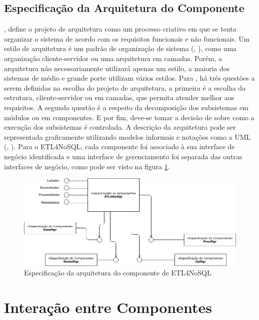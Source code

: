 \subsection{Especificação da Arquitetura do Componente}

\cite{sommerville:2013}, define o projeto de arquitetura como um processo criativo em que se tenta organizar o sistema de acordo com os requisitos funcionais e não funcionais. Um estilo de arquitetura é um padrão de organização de sistema (\cite{shaw:1996}, \cite{sommerville:2013}), como uma organização cliente-servidor ou uma arquitetura em camadas. Porém, a arquitetura não necessariamente utilizará apenas um estilo, a maioria dos sistemas de médio e grande porte utilizam vários estilos. Para \cite{shaw:1996}, há três questões a serem definidas na escolha do projeto de arquitetura, a primeira é a escolha da estrutura, cliente-servidor ou em camadas, que permita atender melhor aos requisitos. A segunda questão é a respeito da decomposição dos subsistemas em módulos ou em componentes. E por fim, deve-se tomar a decisão de sobre como a execução dos subsistemas é controlada. A descrição da arquitetura pode ser representada graficamente utilizando modelos informais e notações como a UML (\cite{clements:2002}, \cite{sommerville:2013}). Para o ETL4NoSQL, cada componente foi associado à sua interface de negócio identificada e uma interface de gerenciamento foi separada das outras interfaces de negócio, como pode ser visto na figura \ref{arquitetura}.

\begin{figure}[h]
	\centering
	\includegraphics[scale=0.5]{fig/arquitetura_comp.png}
	\caption{Especificação da arquitetura do componente de ETL4NoSQL}
	\label{arquitetura}
\end{figure}

\section{Interação entre Componentes}


